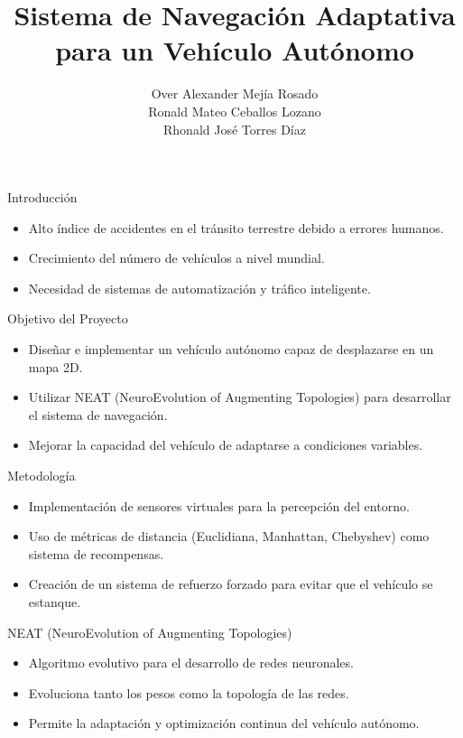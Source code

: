 \documentclass{beamer}
\title{Sistema de Navegación Adaptativa para un Vehículo Autónomo}
\author{
    Over Alexander Mejía Rosado \\
    Ronald Mateo Ceballos Lozano \\
    Rhonald José Torres Díaz
}
\institute{\textit{Inteligencia Artificial} \\
Universidad Nacional de Colombia - De La Paz}
\date{}
\begin{document}
\begin{frame}
    \titlepage
\end{frame}

\begin{frame}{Introducción}
    \begin{itemize}
        \item Alto índice de accidentes en el tránsito terrestre debido a errores humanos.
        \item Crecimiento del número de vehículos a nivel mundial.
        \item Necesidad de sistemas de automatización y tráfico inteligente.
    \end{itemize}
\end{frame}

\begin{frame}{Objetivo del Proyecto}
    \begin{itemize}
        \item Diseñar e implementar un vehículo autónomo capaz de desplazarse en un mapa 2D.
        \item Utilizar NEAT (NeuroEvolution of Augmenting Topologies) para desarrollar el sistema de navegación.
        \item Mejorar la capacidad del vehículo de adaptarse a condiciones variables.
    \end{itemize}
\end{frame}

\begin{frame}{Metodología}
    \begin{itemize}
        \item Implementación de sensores virtuales para la percepción del entorno.
        \item Uso de métricas de distancia (Euclidiana, Manhattan, Chebyshev) como sistema de recompensas.
        \item Creación de un sistema de refuerzo forzado para evitar que el vehículo se estanque.
    \end{itemize}
\end{frame}

\begin{frame}{NEAT (NeuroEvolution of Augmenting Topologies)}
    \begin{itemize}
        \item Algoritmo evolutivo para el desarrollo de redes neuronales.
        \item Evoluciona tanto los pesos como la topología de las redes.
        \item Permite la adaptación y optimización continua del vehículo autónomo.
    \end{itemize}
\end{frame}
\end{document}
